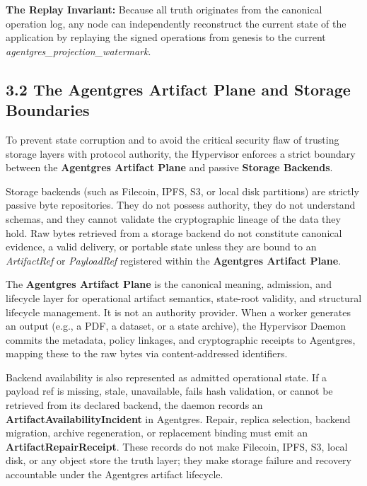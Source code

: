 \documentclass[
  11pt,
]{article}
\begin{document}
\textbf{The Replay Invariant:} Because all truth originates from the
canonical operation log, any node can independently reconstruct the
current state of the application by replaying the signed operations from
genesis to the current \emph{agentgres\_projection\_watermark}.

\hypertarget{the-agentgres-artifact-plane-and-storage-boundaries}{%
\subsection{3.2 The Agentgres Artifact Plane and Storage
Boundaries}\label{the-agentgres-artifact-plane-and-storage-boundaries}}

To prevent state corruption and to avoid the critical security flaw of
trusting storage layers with protocol authority, the Hypervisor enforces
a strict boundary between the \textbf{Agentgres Artifact Plane} and
passive \textbf{Storage Backends}.

Storage backends (such as Filecoin, IPFS, S3, or local disk partitions)
are strictly passive byte repositories. They do not possess authority,
they do not understand schemas, and they cannot validate the
cryptographic lineage of the data they hold. Raw bytes retrieved from a
storage backend do not constitute canonical evidence, a valid delivery,
or portable state unless they are bound to an \emph{ArtifactRef} or
\emph{PayloadRef} registered within the \textbf{Agentgres Artifact
Plane}.

The \textbf{Agentgres Artifact Plane} is the canonical meaning,
admission, and lifecycle layer for operational artifact semantics,
state-root validity, and structural lifecycle management. It is not an
authority provider. When a worker generates an output (e.g., a PDF, a
dataset, or a state archive), the Hypervisor Daemon commits the
metadata, policy linkages, and cryptographic receipts to Agentgres,
mapping these to the raw bytes via content-addressed identifiers.

Backend availability is also represented as admitted operational state.
If a payload ref is missing, stale, unavailable, fails hash validation,
or cannot be retrieved from its declared backend, the daemon records an
\textbf{ArtifactAvailabilityIncident} in Agentgres. Repair, replica
selection, backend migration, archive regeneration, or replacement
binding must emit an \textbf{ArtifactRepairReceipt}. These records do
not make Filecoin, IPFS, S3, local disk, or any object store the truth
layer; they make storage failure and recovery accountable under the
Agentgres artifact lifecycle.
\end{document}

